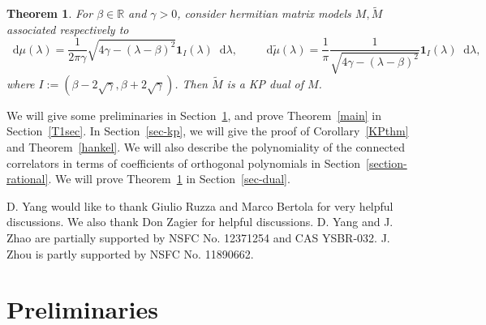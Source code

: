 \documentclass[a4paper]{article}
\theoremstyle{plain}
\newtheorem{thm}{Theorem}
\theoremstyle{definition}
\newcommand{\dif}{\mathop{}\!\mathrm{d}}
\newcommand{\RR}{\mathbb{R}}
\begin{document}
\begin{thm} \label{dual-ex}
	For $\beta\in\RR$ and $\gamma>0$, consider hermitian matrix models $M,\widetilde M$ associated respectively to 
	\begin{equation}
		\dif\mu(\lambda)=\frac{1}{2\pi\gamma}\sqrt{4\gamma-(\lambda-\beta)^2}\mathbf{1}_I(\lambda)\dif\lambda,\qquad \dif\widetilde\mu(\lambda)=\frac{1}{\pi}\frac{1}{\sqrt{4\gamma-(\lambda-\beta)^2}}\mathbf{1}_I(\lambda)\dif\lambda,
	\end{equation}
	where $I:=(\beta-2\sqrt{\gamma},\beta+2\sqrt{\gamma})$. Then $\widetilde M$ is a KP dual of $M$.
\end{thm}

We will give some preliminaries in Section~\ref{prel}, and prove Theorem~\ref{main} in Section~\ref{T1sec}. In Section~\ref{sec-kp}, we will give the proof of Corollary~\ref{KPthm} and Theorem~\ref{hankel}. We will also describe the polynomiality of the connected correlators in terms of coefficients of orthogonal polynomials in Section~\ref{section-rational}. We will prove Theorem~\ref{dual-ex} in Section~\ref{sec-dual}.
\newline
\par{} D. Yang would like to thank Giulio Ruzza and Marco Bertola for very helpful discussions. We also thank Don Zagier for helpful discussions. D. Yang and J. Zhao are partially supported by NSFC No. 12371254 and CAS YSBR-032. J. Zhou is partly supported by NSFC No. 11890662.
	
\section{Preliminaries} \label{prel}
\end{document}
